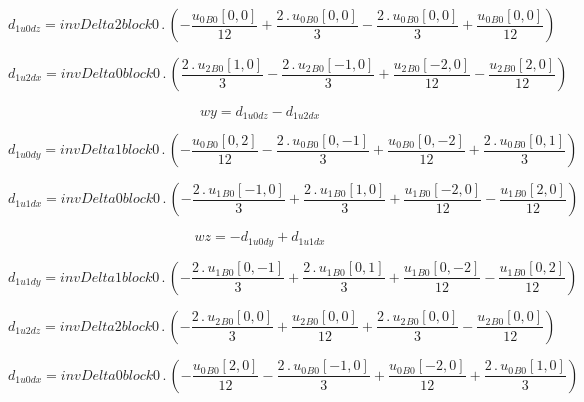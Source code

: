 \documentclass{article}
\begin{document}
\begin{dmath}d_{1 u0 dz} = invDelta2block0 \,.\, \left(- \frac{{u_{0}{_{B0}}}[{0,0}]}{12} + \frac{2 \,.\, {u_{0}{_{B0}}}[{0,0}]}{3} - \frac{2 \,.\, {u_{0}{_{B0}}}[{0,0}]}{3} + \frac{{u_{0}{_{B0}}}[{0,0}]}{12}\right)\end{dmath}

\begin{dmath}d_{1 u2 dx} = invDelta0block0 \,.\, \left(\frac{2 \,.\, {u_{2}{_{B0}}}[{1,0}]}{3} - \frac{2 \,.\, {u_{2}{_{B0}}}[{-1,0}]}{3} + \frac{{u_{2}{_{B0}}}[{-2,0}]}{12} - \frac{{u_{2}{_{B0}}}[{2,0}]}{12}\right)\end{dmath}

\begin{dmath}wy = d_{1 u0 dz} - d_{1 u2 dx}\end{dmath}

\begin{dmath}d_{1 u0 dy} = invDelta1block0 \,.\, \left(- \frac{{u_{0}{_{B0}}}[{0,2}]}{12} - \frac{2 \,.\, {u_{0}{_{B0}}}[{0,-1}]}{3} + \frac{{u_{0}{_{B0}}}[{0,-2}]}{12} + \frac{2 \,.\, {u_{0}{_{B0}}}[{0,1}]}{3}\right)\end{dmath}

\begin{dmath}d_{1 u1 dx} = invDelta0block0 \,.\, \left(- \frac{2 \,.\, {u_{1}{_{B0}}}[{-1,0}]}{3} + \frac{2 \,.\, {u_{1}{_{B0}}}[{1,0}]}{3} + \frac{{u_{1}{_{B0}}}[{-2,0}]}{12} - \frac{{u_{1}{_{B0}}}[{2,0}]}{12}\right)\end{dmath}

\begin{dmath}wz = - d_{1 u0 dy} + d_{1 u1 dx}\end{dmath}

\begin{dmath}d_{1 u1 dy} = invDelta1block0 \,.\, \left(- \frac{2 \,.\, {u_{1}{_{B0}}}[{0,-1}]}{3} + \frac{2 \,.\, {u_{1}{_{B0}}}[{0,1}]}{3} + \frac{{u_{1}{_{B0}}}[{0,-2}]}{12} - \frac{{u_{1}{_{B0}}}[{0,2}]}{12}\right)\end{dmath}

\begin{dmath}d_{1 u2 dz} = invDelta2block0 \,.\, \left(- \frac{2 \,.\, {u_{2}{_{B0}}}[{0,0}]}{3} + \frac{{u_{2}{_{B0}}}[{0,0}]}{12} + \frac{2 \,.\, {u_{2}{_{B0}}}[{0,0}]}{3} - \frac{{u_{2}{_{B0}}}[{0,0}]}{12}\right)\end{dmath}

\begin{dmath}d_{1 u0 dx} = invDelta0block0 \,.\, \left(- \frac{{u_{0}{_{B0}}}[{2,0}]}{12} - \frac{2 \,.\, {u_{0}{_{B0}}}[{-1,0}]}{3} + \frac{{u_{0}{_{B0}}}[{-2,0}]}{12} + \frac{2 \,.\, {u_{0}{_{B0}}}[{1,0}]}{3}\right)\end{dmath}
\end{document}
